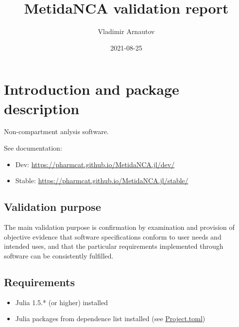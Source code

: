 \documentclass[12pt,a4paper]{article}
\title{ MetidaNCA validation report }
\author{ Vladimir Arnautov }
\date{ 2021-08-25 }
\begin{document}
\maketitle


\section{Introduction and package description}
Non-compartment anlysis software.

See documentation:

\begin{itemize}
\item Dev: \href{https://pharmcat.github.io/MetidaNCA.jl/dev/}{https://pharmcat.github.io/MetidaNCA.jl/dev/}


\item Stable: \href{https://pharmcat.github.io/MetidaNCA.jl/stable/}{https://pharmcat.github.io/MetidaNCA.jl/stable/}

\end{itemize}
\subsection{Validation purpose}
The main validation purpose is confirmation by examination and provision of objective evidence that software specifications conform to user needs and intended uses, and that the particular requirements implemented through software can be consistently fulfilled.

\subsection{Requirements}
\begin{itemize}
\item Julia 1.5.* (or higher) installed


\item Julia packages from dependence list installed (see \href{https://github.com/PharmCat/MetidaNCA.jl/blob/main/Project.toml}{Project.toml})

\end{itemize}
\end{document}
